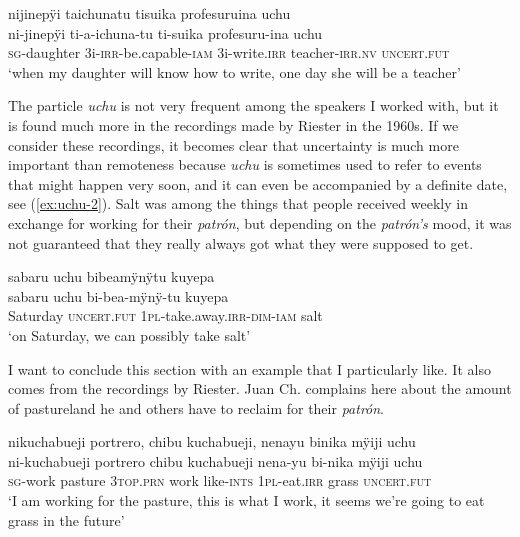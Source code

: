 \ea\label{ex:uchu-5}
\begingl
\glpreamble nijinepÿi taichunatu tisuika profesuruina uchu\\
\gla ni-jinepÿi ti-a-ichuna-tu ti-suika profesuru-ina uchu\\
\textsc{sg}-daughter 3i-\textsc{irr}-be.capable-\textsc{iam} 3i-write.\textsc{irr} teacher-\textsc{irr.nv} \textsc{uncert.fut}\\
\glft ‘when my daughter will know how to write, one day she will be a teacher’
\endgl
\trailingcitation{[jxx-p150920l.068]}
\xe

The particle \textit{uchu} is not very frequent among the speakers I worked with, but it is found much more in the recordings made by Riester in the 1960s. If we consider these recordings, it becomes clear that uncertainty is much more important than remoteness because \textit{uchu} is sometimes used to refer to events that might happen very soon, and it can even be accompanied by a definite date, see (\ref{ex:uchu-2}). Salt was among the things that people received weekly in exchange for working for their \textit{patrón}, but depending on the \textit{patrón’s} mood, it was not guaranteed that they really always got what they were supposed to get.

\ea\label{ex:uchu-2}
\begingl
\glpreamble sabaru uchu bibeamÿnÿtu kuyepa\\
\gla sabaru uchu bi-bea-mÿnÿ-tu kuyepa\\
\glb Saturday \textsc{uncert.fut} 1\textsc{pl}-take.away.\textsc{irr}-\textsc{dim}-\textsc{iam} salt\\
\glft ‘on Saturday, we can possibly take salt’
\endgl
\trailingcitation{[nxx-p630101g-2.63]}
\xe

I want to conclude this section with an example that I particularly like. It also comes from the recordings by Riester. Juan Ch. complains here about the amount of pastureland he and others have to reclaim for their \textit{patrón}.

\ea\label{ex:uchu-6}
\begingl
\glpreamble nikuchabueji portrero, chibu kuchabueji, nenayu binika mÿiji uchu\\
\gla ni-kuchabueji portrero chibu kuchabueji nena-yu bi-nika mÿiji uchu\\
\textsc{sg}-work pasture 3\textsc{top.prn} work like-\textsc{ints} 1\textsc{pl}-eat.\textsc{irr} grass \textsc{uncert.fut}\\
\glft ‘I am working for the pasture, this is what I work, it seems we’re going to eat grass in the future’
\endgl
\trailingcitation{[nxx-p630101g-2.19]}
\xe


